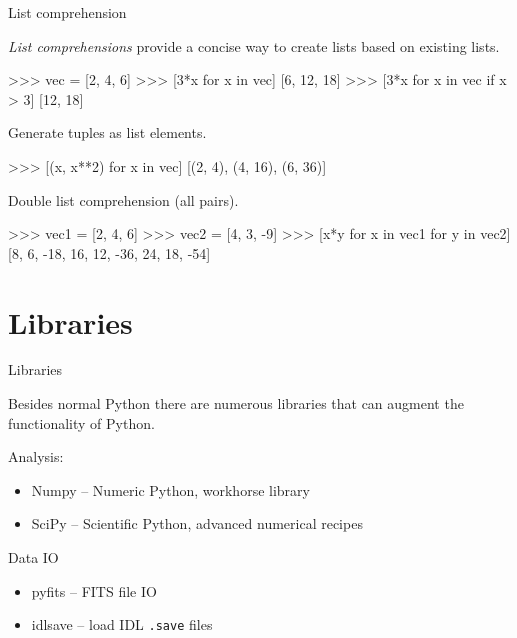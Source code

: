 \documentclass[xetex,10pt]{beamer}
\def\spacer{\vspace*{1em}}
\begin{document}
\begin{frame}[fragile]{List comprehension}

\emph{List comprehensions} provide a concise way to create lists based on existing lists.
	
\begin{python}
>>> vec = [2, 4, 6]
>>> [3*x for x in vec]
[6, 12, 18]
>>> [3*x for x in vec if x > 3]
[12, 18]
\end{python}

\pause
Generate tuples as list elements.

\begin{python}
>>> [(x, x**2) for x in vec]
[(2, 4), (4, 16), (6, 36)]
\end{python}

\pause
Double list comprehension (all pairs).

\begin{python}
>>> vec1 = [2, 4, 6]
>>> vec2 = [4, 3, -9]
>>> [x*y for x in vec1 for y in vec2]
[8, 6, -18, 16, 12, -36, 24, 18, -54]
\end{python}

\end{frame}

\section{Libraries}

\begin{frame}[fragile]{Libraries}

Besides normal Python there are numerous libraries that can augment the functionality of Python.

	\spacer

Analysis:
\begin{itemize}
\item Numpy -- Numeric Python, workhorse library
\item SciPy -- Scientific Python, advanced numerical recipes
\end{itemize}

	\spacer

Data IO
\begin{itemize}
\item pyfits -- FITS file IO
\item idlsave -- load IDL \texttt{.save} files
\end{itemize}

	\spacer
\end{frame}
\end{document}
